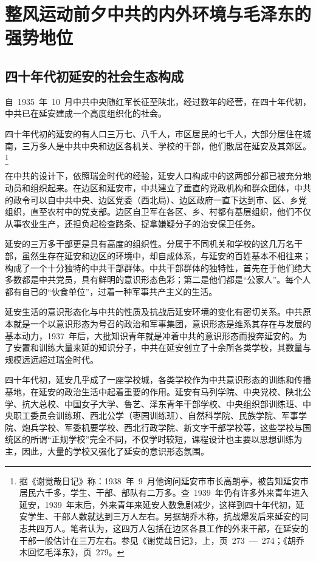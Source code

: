 
\chapter{整风运动前夕中共的内外环境与毛泽东的强势地位}

\section{四十年代初延安的社会生态构成}

自~1935~年~10~月中共中央随红军长征至陕北，经过数年的经营，在四十年代初，中共已在延安建成一个高度组织化的社会。

四十年代初的延安的有人口三万七、八千人，市区居民的七千人，大部分居住在城南，三万多人是中共中央和边区各机关、学校的干部，他们散居在延安及其郊区。\footnote{据《谢觉哉日记》称：1938~年~9~月他询问延安市市长高朗亭，被告知延安市居民六千多，学生、干部、部队有二万多。查~1939~年仍有许多外来青年进入延安，1939~年末后，外来青年来延安人数急剧减少，这样到四十年代初，延安学生、干部人数就达到三万人左右。另据胡乔木称，抗战爆发后来延安的同志共四万人。笔者认为，这四万人包括在边区各县工作的外来干部，在延安的干部一般估计在三万左右。参见《谢觉哉日记》，上，页~273~—~274；《胡乔木回忆毛泽东》，页~279。}

在中共的设计下，依照瑞金时代的经验，延安人口构成中的这两部分都已被充分地动员和组织起来。在边区和延安市，中共建立了垂直的党政机构和群众团体，中共的政令可以自中共中央、边区党委（西北局）、边区政府一直下达到市、区、乡党组织，直至农村中的党支部。边区自卫军在各区、乡、村都有基层组织，他们不仅从事农业生产，还担负起检查路条、捉拿嫌疑分子的治安保卫任务。

延安的三万多干部更是具有高度的组织性。分属于不同机关和学校的这几万名干部，虽然生存在延安和边区的环境中，却自成体系，与延安的百姓基本不相往来；构成了一个十分独特的中共干部群体。中共干部群体的独特性，首先在于他们绝大多数都是中共党员，具有鲜明的意识形态色彩；第二是他们都是“公家人”。每个人都有自已的“伙食单位”，过着一种军事共产主义的生活。

延安生活的意识形态化与中共的性质及抗战后延安环境的变化有密切关系。中共原本就是一个以意识形态为号召的政治和军事集团，意识形态是维系其存在与发展的基本动力，1937~年后，大批知识青年就是冲着中共的意识形态而投奔延安的。为了安置和训练大量来延的知识分子，中共在延安创立了十余所各类学校，其数量与规模远远超过瑞金时代。

四十年代初，延安几乎成了一座学校城，各类学校作为中共意识形态的训练和传播基地，在延安的政治生活中起着重要的作用。延安有马列学院、中央党校、陕北公学、抗大总校、中国女子大学、鲁艺、泽东青年干部学校、中央组织部训练班、中央职工委员会训练班、西北公学（枣园训练班）、自然科学院、民族学院、军事学院、炮兵学校、军委机要学校、西北行政学院、新文字干部学校等，这些学校与国统区的所谓“正规学校”完全不同，不仅学时较短，课程设计也主要以思想训练为主，因此，大量的学校又强化了延安的意识形态氛围。

